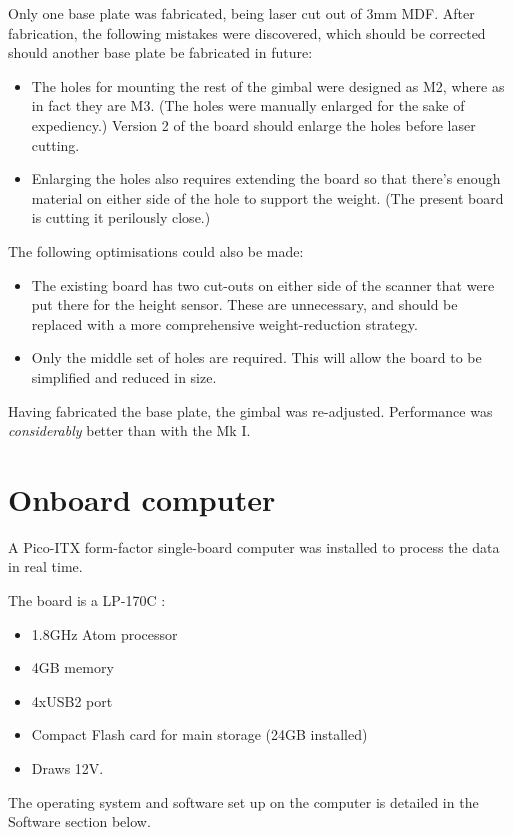 \documentclass[12pt,oneside,a4paper]{book}
\begin{document}
Only one base plate was fabricated, being laser cut out of 3mm
MDF. After fabrication, the following mistakes were discovered, which
should be corrected should another base plate be fabricated in future:
\begin{itemize}
\item The holes for mounting the rest of the gimbal were designed as
  M2, where as in fact they are M3. (The holes were manually enlarged
  for the sake of expediency.) Version 2 of the board should enlarge
  the holes before laser cutting.
\item Enlarging the holes also requires extending the board so that
  there's enough material on either side of the hole to support the
  weight. (The present board is cutting it perilously close.)
\end{itemize}

The following optimisations could also be made:
\begin{itemize}
\item The existing board has two cut-outs on either side of the
  scanner that were put there for the height sensor. These are
  unnecessary, and should be replaced with a more comprehensive
  weight-reduction strategy.
\item Only the middle set of holes are required. This will allow the
  board to be simplified and reduced in size.
\end{itemize}

Having fabricated the base plate, the gimbal was
re-adjusted. Performance was \emph{considerably} better than with the
Mk I.

\section{Onboard computer}
\label{sec:onboard-computer}

A Pico-ITX form-factor single-board computer was installed to process
the data in real time. 

The board is a LP-170C \cite{pc}:
\begin{itemize}
\item 1.8GHz Atom processor
\item 4GB memory
\item 4xUSB2 port
\item Compact Flash card for main storage (24GB installed)
\item Draws 12V.
\end{itemize}

The operating system and software set up on the computer is detailed
in the Software section below.
\end{document}
